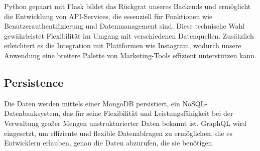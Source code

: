 \documentclass[conference,a4paper,flushend]{cs-techrep}
\begin{document}
Python gepaart mit Flask bildet das Rückgrat unseres Backends und ermöglicht die Entwicklung von API-Services, die essenziell für Funktionen wie Benutzerauthentifizierung und Datenmanagement sind. Diese technische Wahl gewährleistet Flexibilität im Umgang mit verschiedenen Datenquellen. Zusätzlich erleichtert es die Integration mit Plattformen wie Instagram, wodurch unsere Anwendung eine breitere Palette von Marketing-Tools effizient unterstützen kann. 

\subsection{Persistence}

Die Daten werden mittels einer MongoDB persistiert, ein NoSQL-Datenbanksystem, das für seine Flexibilität und Leistungsfähigkeit bei der Verwaltung großer Mengen unstrukturierter Daten bekannt ist. GraphQL wird eingesetzt, um effiziente und flexible Datenabfragen zu ermöglichen, die es Entwicklern erlauben, genau die Daten abzurufen, die sie benötigen.



\nocite{ModA-TR-2023SS-WAE-TeamWeiss-Neunerln}
\nocite{ModA-TR-2023SS-BDCC-TeamRot-CompVisPipeline}
\nocite{ModA-TR-2023SS-BDCC-TeamBlau-NauticalNonsense}
\nocite{ModA-TR-2023SS-BCN-TeamGruen-TorpedoTactics}
\nocite{ModA-TR-2023SS-BCN-TeamCyan-Stockbird}
\nocite{ModA-TR-2023SS-BCN-TeamBlau-FancyChess}
\nocite{ModA-TR-2023WS-SWT-TeamRot-SGDb}
\nocite{ModA-TR-2023WS-SWT-TeamGruen-OPCUANetzwerk}
\nocite{ModA-TR-2022SS-WAE-TeamWeiss-WoIstMeinGeld}
\nocite{ModA-TR-2022SS-BDCC-TeamWeiss-TwitterDash}
\nocite{ModA-TR-2022SS-BDCC-TeamRot-Reddiment}
\nocite{ModA-TR-2022SS-BDCC-TeamGruen-ExplosionGuy}
\nocite{ModA-TR-2022SS-BDCC-TeamCyan-OTHWiki}
\nocite{ModA-TR-2022WS-SWT-TeamGruen-Graphvio}
\nocite{ModA-TR-2021SS-WAE-TeamWeiss-CovidDashboard}
\nocite{ModA-TR-2021SS-WAE-TeamRot-FireForceDefense}
\nocite{ModA-TR-2021SS-WAE-TeamGruen-MedPlanner}

\sloppy
\printbibliography[notcategory=selfref]
\end{document}
